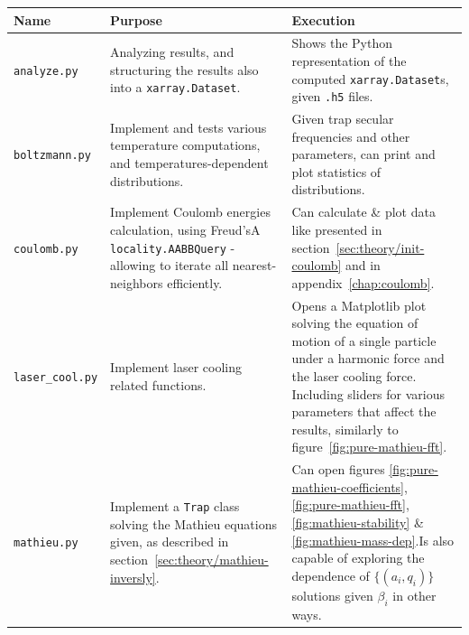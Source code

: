 \begin{table}
\begin{tabularx}{\textwidth}{l|X|X}
\textbf{Name}                   & \textbf{Purpose}                                                                                                                                       & \textbf{Execution}                                                                                                                                                                                                                                   \\
\hline
\texttt{analyze.py}             & Analyzing results, and structuring the results also into a \texttt{xarray.Dataset}.                                                                    & Shows the Python representation of the computed \texttt{xarray.Dataset}s, given \texttt{.h5} files.                                                                                                                                                  \\
\hline
\texttt{boltzmann.py}           & Implement and tests various temperature computations, and temperatures-dependent distributions.                                                        & Given trap secular frequencies and other parameters, can print and plot statistics of distributions.                                                                                                                                                 \\
\hline
\texttt{coulomb.py}             & Implement Coulomb energies calculation, using Freud'sA\cite{freud} \texttt{locality.AABBQuery} - allowing to iterate all nearest-neighbors efficiently. & Can calculate \& plot data like presented in section~\ref{sec:theory/init-coulomb} and in appendix~\ref{chap:coulomb}.                                                                                                                                      \\
\hline
\texttt{laser\_cool.py}         & Implement laser cooling related functions.                                                                                                             & Opens a Matplotlib plot solving the equation of motion of a single particle under a harmonic force and the laser cooling force. Including sliders for various parameters that affect the results, similarly to figure~\ref{fig:pure-mathieu-fft}.    \\
\hline
\texttt{mathieu.py}             & Implement a \texttt{Trap} class solving the Mathieu equations given, as described in section~\ref{sec:theory/mathieu-inversly}.                                  & Can open figures \ref{fig:pure-mathieu-coefficients}, \ref{fig:pure-mathieu-fft}, \ref{fig:mathieu-stability} \& \ref{fig:mathieu-mass-dep}.Is also capable of exploring the dependence of $\{(a_i, q_i)\}$ solutions given $\beta_i$ in other ways. \\

\end{tabularx}
\end{table}
